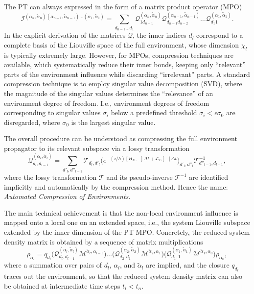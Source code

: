 \documentclass{scrartcl}
\begin{document}
The PT can always expressed in the form of a matrix product operator (MPO)
%
\begin{equation}
\mathcal{I}^{(\alpha_{n},\tilde{\alpha}_{n})(\alpha_{n-1},\tilde{\alpha}_{n-1})
\dots (\alpha_{1},\tilde{\alpha}_{1})}
= 
\sum_{d_{n-1}\dots d_1}
\mathcal{Q}_{1 d_{n-1}}^{(\alpha_{n},\tilde{\alpha}_{n})}
\mathcal{Q}_{d_{n-1} d_{n-2}}^{(\alpha_{n-1},\tilde{\alpha}_{n-1})}\dots
\mathcal{Q}_{d_1 1}^{(\alpha_{1},\tilde{\alpha}_{1})}.
\end{equation}
In the explicit derivation of the matrices $\mathcal{Q}$, the inner indices
$d_l$ correspond to a complete basis of the Liouville space 
of the full environment, whose dimension $\chi_l$ is typically 
extremely large. 
However, for MPOs, compression techniques are available, which systematically
reduce their inner bonds, keeping only ``relevant'' parts of the 
environment influence while discarding ``irrelevant'' parts.
A standard compression technique is to employ singular value decomposition 
(SVD), where the magnitude of the singular values determines the ``relevance''
of an environment degree of freedom. I.e., environment degrees of freedom
corresponding to singular values $\sigma_i$ 
below a predefined threshold $\sigma_i<\epsilon\sigma_0$ are disregarded, where
$\sigma_0$ is the largest singular value.

The overall procedure can be understood as compressing the full environment
propagator to its relevant subspace via a lossy transformation
\begin{equation}
\mathcal{Q}^{(\alpha_l,\tilde{\alpha}_l)}_{d_l,d_{l-1}}=
\sum_{d'_l,d''_{l-1}}\mathcal{T}_{d_l,d'_l} 
\Big(e^{ -(i/\hbar)[H_E, \,.\, ] \Delta t
+\mathcal{L}_E[\,.\,]\Delta t }\Big)_{d'_l,d''_l}
\mathcal{T}^{-1}_{d''_{l-1},d_{l-1}},
\end{equation} 
where the lossy transformation $\mathcal{T}$ and its pseudo-inverse 
$\mathcal{T}^{-1}$ are identified implicitly and automatically by the 
compression method. Hence the name: 
\emph{Automated Compression of Environments}.

The main technical achievement is that the non-local environment influence
is mapped onto a local one on an extended space, i.e., the system Liouville 
subspace extended by the inner dimension of the PT-MPO. Concretely, the 
reduced system density matrix is obtained by a sequence of matrix 
multiplications
\begin{equation}
\rho_{\alpha_l} = q_{d_l} 
\big( \mathcal{Q}^{(\alpha_l, \tilde{\alpha}_l)}_{d_l,d_{l-1}} 
\mathcal{M}^{\tilde{\alpha}_l,\alpha_{l-1}}\big) 
\dots 
\big( \mathcal{Q}^{(\alpha_{2}, \tilde{\alpha}_{2})}_{d_{2},d_{1}} 
\mathcal{M}^{\tilde{\alpha}_{2},\alpha_{1}}\big) 
\big( \mathcal{Q}^{(\alpha_{1}, \tilde{\alpha}_{1})}_{d_{1},1} 
\mathcal{M}^{\tilde{\alpha}_{1},\alpha_{0}}\big) \rho_{\alpha_0},
\label{eq:propagation}
\end{equation}
where a summation over pairs of $d_l$, $\alpha_{l}$, and $\tilde{\alpha}_l$ 
are implied, and the closure $q_{d_l}$ traces out the environment, so that
the reduced system density matrix can also be obtained at intermediate 
time steps $t_l<t_n$.
\end{document}
